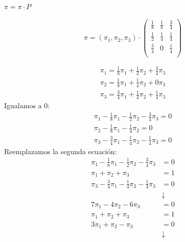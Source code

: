 \documentclass{templateNote}
\begin{document}
$\pi = \pi \cdot P$

\begin{equation*}
    \pi = (\pi_1, \pi_2, \pi_3) 
    \cdot
    \begin{pmatrix}
        \frac{1}{8}   &  \frac{1}{8}    & \frac{3}{4}  \\
        \frac{1}{2}   &  \frac{1}{4}    & \frac{1}{4}  \\
        \frac{3}{4}   &       0         & \frac{1}{4}\\
    \end{pmatrix}
\end{equation*}

\begin{align*}
    \pi_1 = \frac{1}{8} \pi_1 + \frac{1}{2} \pi_2 + \frac{3}{4} \pi_3\\
    \pi_2 = \frac{1}{8} \pi_1 + \frac{1}{4} \pi_2 + 0 \pi_3\\
    \pi_3 = \frac{3}{4} \pi_1 + \frac{1}{4} \pi_2 + \frac{1}{4} \pi_3
\end{align*}
Igualamos a 0:
\begin{align*}
    \pi_1 - \frac{1}{8} \pi_1 - \frac{1}{2} \pi_2 - \frac{3}{4} \pi_3 = 0\\
    \pi_2 - \frac{1}{8} \pi_1 - \frac{1}{4} \pi_2 = 0\\
    \pi_3 - \frac{3}{4} \pi_1 - \frac{1}{4} \pi_2 - \frac{1}{4} \pi_3 = 0
\end{align*}
Reemplazamos la segunda ecuación:
\begin{align*}
    \pi_1 - \frac{1}{8} \pi_1 - \frac{1}{2} \pi_2 - \frac{3}{4} \pi_3 &= 0\\
    \pi_1 + \pi_2 + \pi_3 &= 1\\
    \pi_3 - \frac{3}{4} \pi_1 - \frac{1}{4} \pi_2 - \frac{1}{4} \pi_3 &= 0\\
    \phantom{\pi_1 + \pi_2 + \pi_3} &\downarrow\\
    7\pi_1 - 4\pi_2 - 6\pi_3 &= 0\\
    \pi_1 + \pi_2 + \pi_3 &= 1\\
    3\pi_1 + \pi_2 - \pi_3 &= 0\\
    \phantom{\pi_1 + \pi_2 + \pi_3} &\downarrow\\
\end{align*}
\end{document}
